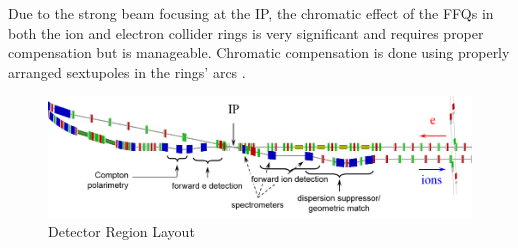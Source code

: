 Due to the strong beam focusing at the IP, the chromatic effect of the FFQs in both the ion and electron collider rings is very significant and requires proper compensation but is manageable. Chromatic compensation is done using properly arranged sextupoles in the rings’ arcs \cite{Nosochkov:2015}.

\begin{figure}[!htb]
	\centering
	\includegraphics[width=.75\textwidth]{../../img/detector_region_layout}
	\caption{Detector Region Layout}
	\label{fig:detector_region_layout}
\end{figure}